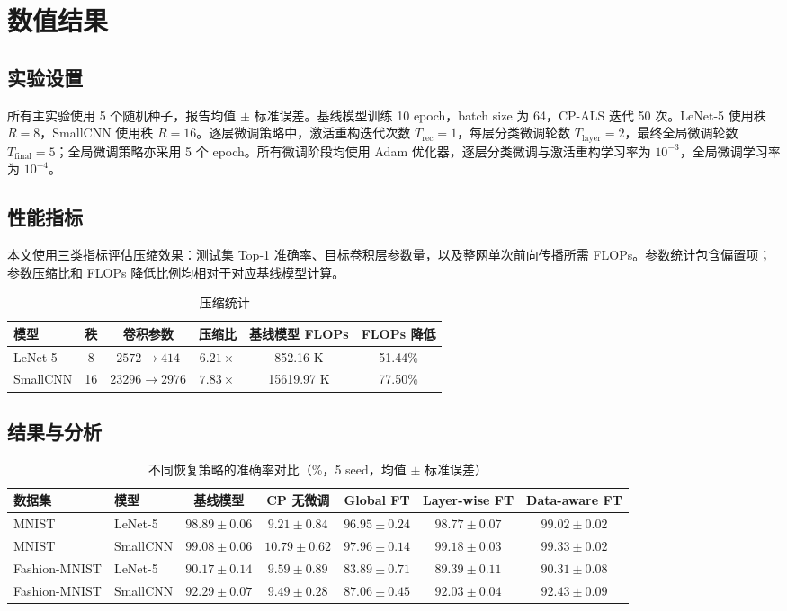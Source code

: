 \documentclass[11pt,a4paper,fontset=fandol]{ctexart}
\begin{document}
\section{数值结果}
\subsection{实验设置}
所有主实验使用 5 个随机种子，报告均值 $\pm$ 标准误差。基线模型训练 10 epoch，batch size 为 64，CP-ALS 迭代 50 次。LeNet-5 使用秩 $R=8$，SmallCNN 使用秩 $R=16$。逐层微调策略中，激活重构迭代次数 $T_{\mathrm{rec}}=1$，每层分类微调轮数 $T_{\mathrm{layer}}=2$，最终全局微调轮数 $T_{\mathrm{final}}=5$；全局微调策略亦采用 5 个 epoch。所有微调阶段均使用 Adam 优化器，逐层分类微调与激活重构学习率为 $10^{-3}$，全局微调学习率为 $10^{-4}$。

\subsection{性能指标}
本文使用三类指标评估压缩效果：测试集 Top-1 准确率、目标卷积层参数量，以及整网单次前向传播所需 FLOPs。参数统计包含偏置项；参数压缩比和 FLOPs 降低比例均相对于对应基线模型计算。

\begin{table}[H]
\centering
\caption{压缩统计}
\small
\begin{tabular}{lccccc}
\toprule
模型 & 秩 & 卷积参数 & 压缩比 & 基线模型 FLOPs & FLOPs 降低 \\
\midrule
LeNet-5 & 8 & $2572\to414$ & $6.21\times$ & 852.16 K & 51.44\% \\
SmallCNN & 16 & $23296\to2976$ & $7.83\times$ & 15619.97 K & 77.50\% \\
\bottomrule
\end{tabular}
\end{table}

\subsection{结果与分析}
\begin{table}[H]
\centering
\caption{不同恢复策略的准确率对比（\%，5 seed，均值 $\pm$ 标准误差）}
\small
\begin{tabular}{llccccc}
\toprule
数据集 & 模型 & 基线模型 & CP 无微调 & Global FT & Layer-wise FT & Data-aware FT \\
\midrule
MNIST & LeNet-5 & $98.89\pm0.06$ & $9.21\pm0.84$ & $96.95\pm0.24$ & $98.77\pm0.07$ & $\mathbf{99.02\pm0.02}$ \\
MNIST & SmallCNN & $99.08\pm0.06$ & $10.79\pm0.62$ & $97.96\pm0.14$ & $99.18\pm0.03$ & $\mathbf{99.33\pm0.02}$ \\
Fashion-MNIST & LeNet-5 & $90.17\pm0.14$ & $9.59\pm0.89$ & $83.89\pm0.71$ & $89.39\pm0.11$ & $\mathbf{90.31\pm0.08}$ \\
Fashion-MNIST & SmallCNN & $92.29\pm0.07$ & $9.49\pm0.28$ & $87.06\pm0.45$ & $92.03\pm0.04$ & $\mathbf{92.43\pm0.09}$ \\
\bottomrule
\end{tabular}
\end{table}
\end{document}
